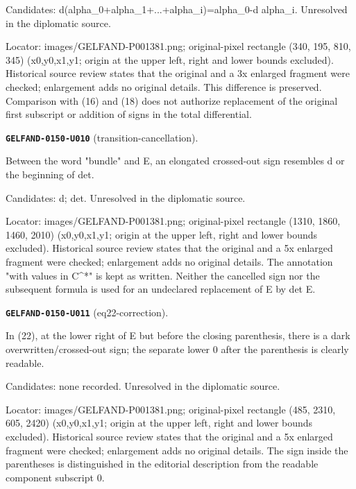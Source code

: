 \documentclass[11pt]{article}
\theoremstyle{definition}
\theoremstyle{remark}
\begin{document}
Candidates: d(alpha\_0+alpha\_1+...+alpha\_i)=alpha\_0-d alpha\_i. Unresolved in the diplomatic source.\par
Locator: images/GELFAND-P001381.png; original-pixel rectangle (340, 195, 810, 345) (x0,y0,x1,y1; origin at the upper left, right and lower bounds excluded). Historical source review states that the original and a 3x enlarged fragment were checked; enlargement adds no original details. This difference is preserved. Comparison with (16) and (18) does not authorize replacement of the original first subscript or addition of signs in the total differential.\par\medskip
\noindent\leavevmode{}\label{GELFAND-P001381:transition-cancellation:note}\textbf{\texttt{GELFAND-0150-U010}} (transition-cancellation).\par\nopagebreak[4]
Between the word "bundle" and E, an elongated crossed-out sign resembles d or the beginning of det.\par
Candidates: d; det. Unresolved in the diplomatic source.\par
Locator: images/GELFAND-P001381.png; original-pixel rectangle (1310, 1860, 1460, 2010) (x0,y0,x1,y1; origin at the upper left, right and lower bounds excluded). Historical source review states that the original and a 5x enlarged fragment were checked; enlargement adds no original details. The annotation "with values in C\textasciicircum{}*" is kept as written. Neither the cancelled sign nor the subsequent formula is used for an undeclared replacement of E by det E.\par\medskip
\noindent\leavevmode{}\label{GELFAND-P001381:eq22-correction:note}\textbf{\texttt{GELFAND-0150-U011}} (eq22-correction).\par\nopagebreak[4]
In (22), at the lower right of E but before the closing parenthesis, there is a dark overwritten/crossed-out sign; the separate lower 0 after the parenthesis is clearly readable.\par
Candidates: none recorded. Unresolved in the diplomatic source.\par
Locator: images/GELFAND-P001381.png; original-pixel rectangle (485, 2310, 605, 2420) (x0,y0,x1,y1; origin at the upper left, right and lower bounds excluded). Historical source review states that the original and a 5x enlarged fragment were checked; enlargement adds no original details. The sign inside the parentheses is distinguished in the editorial description from the readable component subscript 0.\par\medskip
\end{document}
